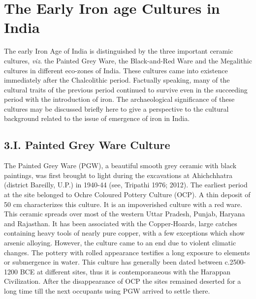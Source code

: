 \vspace{-.3cm}

\section*{The Early Iron age Cultures in India}\label{section-3}

\vspace{-.2cm}

The early Iron Age of India is distinguished by the three important ceramic cultures, \textit{viz}. the Painted Grey Ware, the Black-and-Red Ware and the Megalithic cultures in different eco-zones of India. These cultures came into existence immediately after the Chalcolithic period. Factually speaking, many of the cultural traits of the previous period continued to survive even in the succeeding period with the introduction of iron. The archaeological significance of these cultures may be discussed briefly here to give a perspective to the cultural background related to the issue of emergence of iron in India.

\vspace{-.3cm}

\subsection*{3.I. Painted Grey Ware Culture}\label{subsection-8}

\vspace{-.2cm}

The Painted Grey Ware (PGW), a beautiful smooth grey ceramic with black paintings, was first brought to light during the excavations at Ahichchhatra (district Bareilly, U.P.) in 1940-44 (see, Tripathi 1976; 2012). The earliest period at the site belonged to Ochre Coloured Pottery Culture (OCP). A thin deposit of 50 cm characterizes this culture. It is an impoverished culture with a red ware. This ceramic spreads over most of the western Uttar Pradesh, Punjab, Haryana and Rajasthan. It has been associated with the Copper-Hoards, large catches containing heavy tools of nearly pure copper, with a few exceptions which show arsenic alloying. However, the culture came to an end due to violent climatic changes. The pottery with rolled appearance testifies a long exposure to elements or submergence in water. This culture has generally been dated between c.2500-1200 BCE at different sites, thus it is contemporaneous with the Harappan Civilization. After the disappearance of OCP the sites remained deserted for a long time till the next occupants using PGW arrived to settle there. 


